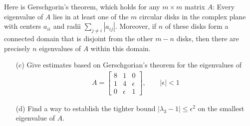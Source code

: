 \documentclass[10pt]{article}
\begin{document}
\begin{problem}[Exercise 24.2]
Here is Gerschgorin's theorem, which holds for any \( m\times m \) matrix \( A \): Every eigenvalue of \( A \) lies in at least one of the \( m \) circular disks in the complex plane with centers \( a_{ii} \) and radii \( \sum_{j\neq i} |a_{ij}| \). Moreover, if \( n \) of these disks form a connected domain that is disjoint from the other \( m-n \) disks, then there are precisely \( n \) eigenvalues of \( A \) within this domain.
\begin{enumerate}
    \item[(c)] Give estimates based on Gerschgorian's theorem for the eigenvalues of
        \begin{align*}
            A=\left[\begin{array}{rrr}8&1&0\\1&4&\epsilon\\0&\epsilon&1\end{array}\right], \qquad |\epsilon|<1
        \end{align*}
    \item[(d)] Find a way to establish the tighter bound \( |\lambda_3-1|\leq \epsilon^2 \) on the smallest eigenvalue of \( A \).
\end{enumerate}
\end{problem}
\end{document}
